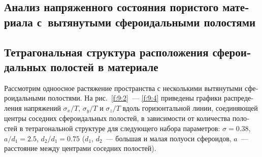 \begin{russian}
\section[Анализ напряженного состояния пористого материала с вытянутыми сфероидальными полостями]{Анализ напряженного состояния пористого материала с~вытянутыми сфероидальными полостями}

\subsection{Тетрагональная структура расположения сфероидальных полостей в материале}

Рассмотрим одноосное растяжение пространства с несколькими вытянутыми сфероидальными полостями. На рис.~\ref{f:9:2}~--- \ref{f:9:4} приведены графики распределения напряжений $\sigma_x/T$, $\sigma_y/T$ и $\sigma_z/T$ вдоль горизонтальной  линии, соединяющей центры соседних сфероидальных полостей, в зависимости от количества полостей в тетрагональной структуре для следующего набора параметров: $\sigma=0.38$, $a/d_1=2.5$, $d_2/d_1=0.75$ ($d_1$, $d_2$~--- большая и малая полуоси сфероидов, $a$~--- расстояние между центрами соседних полостей).


\end{russian}
